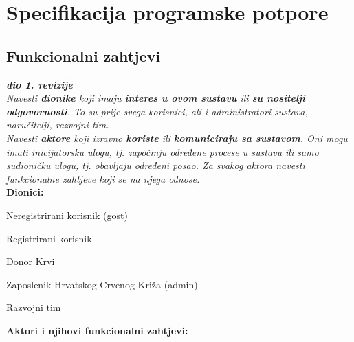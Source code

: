 \chapter{Specifikacija programske potpore}
		
	\section{Funkcionalni zahtjevi}
			
			\textbf{\textit{dio 1. revizije}}\\
			
			\textit{Navesti \textbf{dionike} koji imaju \textbf{interes u ovom sustavu} ili  \textbf{su nositelji odgovornosti}. To su prije svega korisnici, ali i administratori sustava, naručitelji, razvojni tim.}\\
				
			\textit{Navesti \textbf{aktore} koji izravno \textbf{koriste} ili \textbf{komuniciraju sa sustavom}. Oni mogu imati inicijatorsku ulogu, tj. započinju određene procese u sustavu ili samo sudioničku ulogu, tj. obavljaju određeni posao. Za svakog aktora navesti funkcionalne zahtjeve koji se na njega odnose.}\\
			
			
			\noindent \textbf{Dionici:}
			
			\begin{packed_enum}
				
				\item Neregistrirani korisnik (gost)
				\item Registrirani korisnik
				\begin{packed_enum}
					\item Donor Krvi
					\item Zaposlenik Hrvatskog Crvenog Križa (admin)
				\end{packed_enum}
				\item Razvojni tim
				
			\end{packed_enum}
			
			\noindent \textbf{Aktori i njihovi funkcionalni zahtjevi:}
			
